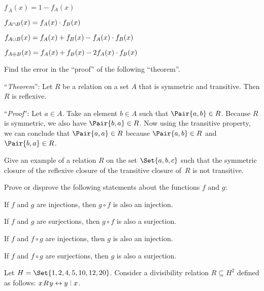 \documentclass[a4paper,12pt]{article}
\begin{document}
\begin{tasks}
    \begin{subtasks}
        \item $f_{\,\overline{A}} (x) = 1 - f_A(x)$
        \item $f_{A \cap B} (x) = f_A(x) \cdot f_B(x)$
        \item $f_{A \cup B} (x) = f_A(x) + f_B(x) - f_A(x) \cdot f_B(x)$
        \item $f_{A \oplus B} (x) = f_A(x) + f_B(x) - 2 f_A(x) \cdot f_B(x)$
    \end{subtasks}


    \item Find the error in the \enquote{proof} of the following \enquote{theorem}.

    \smallskip
    \enquote{\textit{Theorem}}: Let $R$ be a relation on a set $A$ that is symmetric and transitive. Then $R$ is reflexive.

    \smallskip
    \enquote{\textit{Proof}}: Let $a \in A$. Take an element $b \in A$ such that $\Pair{a, b} \in R$. Because $R$ is symmetric, we also have $\Pair{b, a} \in R$. Now using the transitive property, we can conclude that $\Pair{a, a} \in R$ because $\Pair{a, b} \in R$ and $\Pair{b, a} \in R$.


    \item Give an example of a relation $R$ on the set $\Set{a, b, c}$ such that the symmetric closure of the reflexive closure of the
    transitive closure of~$R$ is not transitive.


    \item Prove or disprove the following statements about the functions $f$ and $g$:

    \begin{subtasks}
        \item If $f$ and $g$ are injections, then $g \circ f$ is also an injection.
        \item If $f$ and $g$ are surjections, then $g \circ f$ is also a surjection.
        \item If $f$ and $f \circ g$ are injections, then $g$ is also an injection.
        \item If $f$ and $f \circ g$ are surjections, then $g$ is also a surjection.
    \end{subtasks}


    \item Let $H = \Set{1, 2, 4, 5, 10, 12, 20}$.
    Consider a divisibility relation $R \subseteq H^2$ defined as follows: $x \!\rel\!\nobreak y \iff y \divby\nobreak x$.


\end{tasks}
\end{document}
